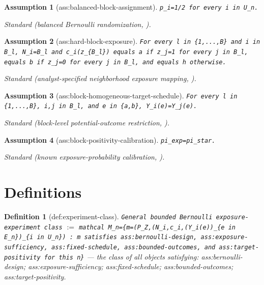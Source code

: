 \documentclass{article}
\newtheorem{assumption}{Assumption}
\newtheorem{definition}{Definition}
\begin{document}
\begin{assumption}[ass:balanced-block-assignment]\label{ass:balanced-block-assignment}
\texttt{p\_i=1/2 for every i in U\_n.}
\par\smallskip\noindent\emph{Standard} (balanced Bernoulli randomization, \cite{AronowSamii2017}).
\end{assumption}

\begin{assumption}[ass:hard-block-exposure]\label{ass:hard-block-exposure}
\texttt{For every l in \{1,...,B\} and i in B\_l, N\_i=B\_l and c\_i(z\_\{B\_l\}) equals a if z\_j=1 for every j in B\_l, equals b if z\_j=0 for every j in B\_l, and equals h otherwise.}
\par\smallskip\noindent\emph{Standard} (analyst-specified neighborhood exposure mapping, \cite{AronowSamii2017}).
\end{assumption}

\begin{assumption}[ass:block-homogeneous-target-schedule]\label{ass:block-homogeneous-target-schedule}
\texttt{For every l in \{1,...,B\}, i,j in B\_l, and e in \{a,b\}, Y\_i(e)=Y\_j(e).}
\par\smallskip\noindent\emph{Standard} (block-level potential-outcome restriction, \cite{TchetgenTchetgenVanderWeele2012}).
\end{assumption}

\begin{assumption}[ass:block-positivity-calibration]\label{ass:block-positivity-calibration}
\texttt{pi\_exp=pi\_star.}
\par\smallskip\noindent\emph{Standard} (known exposure-probability calibration, \cite{AronowSamii2017}).
\end{assumption}

\section{Definitions}

\begin{definition}[def:experiment-class]\label{def:experiment-class}
\texttt{General bounded Bernoulli exposure-experiment class} $:=$ \texttt{mathcal M\_n=\{m=(P\_Z,(N\_i,c\_i,(Y\_i(e))\_\{e in E\_n\})\_\{i in U\_n\}) : m satisfies ass:bernoulli-design, ass:exposure-sufficiency, ass:fixed-schedule, ass:bounded-outcomes, and ass:target-positivity for this n\}} --- the class of all objects satisfying: ass:bernoulli-design; ass:exposure-sufficiency; ass:fixed-schedule; ass:bounded-outcomes; ass:target-positivity.
\end{definition}
\end{document}
